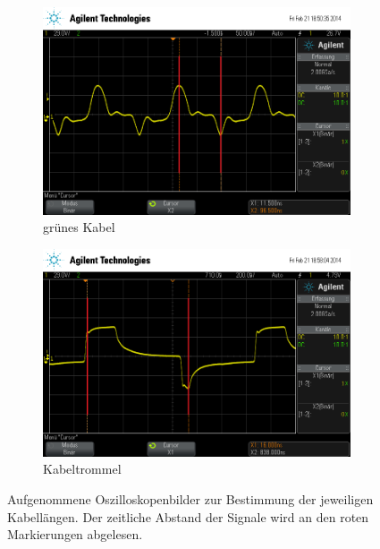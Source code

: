 \begin{figure}
  \begin{subfigure}{0.4\textwidth}
    \includegraphics[width=\textwidth]{laenge_gruen.png}
    \caption{grünes Kabel}
    \label{fig:laenge_gruen}  
  \end{subfigure}
  \quad
  \begin{subfigure}{0.4\textwidth}
    \includegraphics[width=\textwidth]{laenge_trommel.png}
    \caption{Kabeltrommel}
    \label{fig:laenge_trommel}
  \end{subfigure}

  \caption{Aufgenommene Oszilloskopenbilder zur Bestimmung der 
jeweiligen Kabellängen. Der zeitliche Abstand der Signale wird an 
den roten Markierungen abgelesen.}
\end{figure}
%
\FloatBarrier
%
